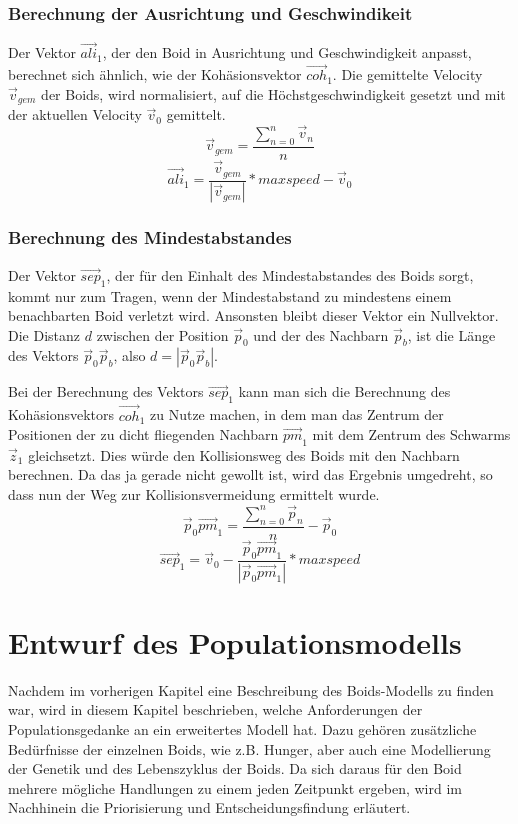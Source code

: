 \documentclass[draft=false
              ,paper=a4
              ,twoside=false
              ,fontsize=11pt
              ,headsepline
              ,BCOR10mm
              ,DIV11
              ,bibtotoc
              ,liststotoc
              ]{scrbook}
\begin{document}
\subsection{Berechnung der Ausrichtung und Geschwindikeit}
Der Vektor \(\vec{ali}_1\), der den Boid in Ausrichtung und Geschwindigkeit anpasst, berechnet sich ähnlich, wie der Kohäsionsvektor \(\vec{coh}_1\). Die gemittelte Velocity \(\vec{v}_{gem}\) der Boids, wird normalisiert, auf die Höchstgeschwindigkeit gesetzt und mit der aktuellen Velocity \(\vec{v}_0\) gemittelt.
\[\vec{v}_{gem} = \frac{\sum \limits_{n=0}^n \vec{v}_n}{n}\]
\[\vec{ali}_1 = \frac{\vec{v}_{gem}}{|\vec{v}_{gem}|} * maxspeed - \vec{v}_0\]

\subsection{Berechnung des Mindestabstandes}
Der Vektor \(\vec{sep}_1\), der für den Einhalt des Mindestabstandes des Boids sorgt, kommt nur zum Tragen, wenn der Mindestabstand zu mindestens einem benachbarten Boid verletzt wird. Ansonsten bleibt dieser Vektor ein Nullvektor. Die Distanz \(d\) zwischen der Position \(\vec{p}_0\) und der des Nachbarn \(\vec{p}_b\), ist die Länge des Vektors \(\vec{p}_0\vec{p}_b\), also \(d = |\vec{p}_0\vec{p}_b|\).

Bei der Berechnung des Vektors \(\vec{sep}_1\) kann man sich die Berechnung des Kohäsionsvektors \(\vec{coh}_1\) zu Nutze machen, in dem man das Zentrum der Positionen der zu dicht fliegenden Nachbarn \(\vec{pm}_1\) mit dem Zentrum des Schwarms \(\vec{z}_1\) gleichsetzt. Dies würde den Kollisionsweg des Boids mit den Nachbarn berechnen. Da das ja gerade nicht gewollt ist, wird das Ergebnis umgedreht, so dass nun der Weg zur Kollisionsvermeidung ermittelt wurde.
\[\vec{p}_0\vec{pm}_1 = \frac{\sum \limits_{n=0}^n \vec{p}_n}{n} - \vec{p}_0\]
\[\vec{sep}_1 = \vec{v}_0 - \frac{\vec{p}_0\vec{pm}_1}{|\vec{p}_0\vec{pm}_1|} * maxspeed\]

\chapter{Entwurf des Populationsmodells}\label{modell}
Nachdem im vorherigen Kapitel eine Beschreibung des Boids-Modells zu finden war, wird in diesem Kapitel beschrieben, welche Anforderungen der Populationsgedanke an ein erweitertes Modell hat. Dazu gehören zusätzliche Bedürfnisse der einzelnen Boids, wie z.B. Hunger, aber auch eine Modellierung der Genetik und des Lebenszyklus der Boids. Da sich daraus für den Boid mehrere mögliche Handlungen zu einem jeden Zeitpunkt ergeben, wird im Nachhinein die Priorisierung und Entscheidungsfindung erläutert.
\end{document}
